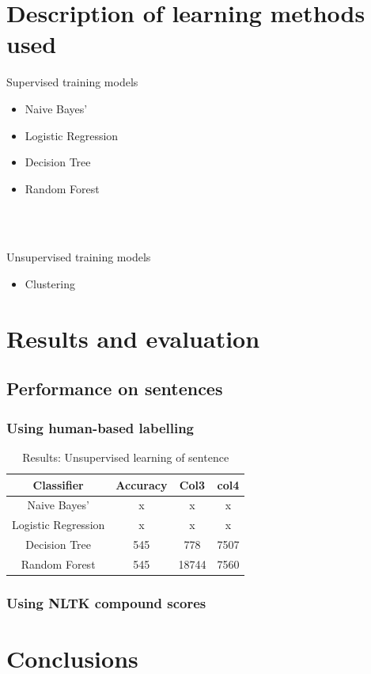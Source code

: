 \documentclass[10pt, a4paper]{article}
\begin{document}
\section{Description of learning methods used}

Supervised training models
\begin{itemize}
    \item Naive Bayes'
    \item Logistic Regression
    \item Decision Tree
    \item Random Forest
\end{itemize}\\\


Unsupervised training models
\begin{itemize}
    \item Clustering
\end{itemize}

\section{Results and evaluation}

\subsection{Performance on sentences}

\subsubsection{Using human-based labelling}

\begin{table}[h]
\begin{center}
\begin{tabular}{||c c c c||} 
 \hline
 Classifier & Accuracy & Col3 & col4 \\ [0.5ex] 
 \hline\hline
 Naive Bayes' & x & x & x \\ 
 \hline 
 Logistic Regression & x & x & x \\
 \hline
 Decision Tree & 545 & 778 & 7507 \\
 \hline
 Random Forest & 545 & 18744 & 7560 \\
 \hline\hline
\end{tabular}
\caption{Results: Unsupervised learning of sentence}
\label{table:1}
\end{center}
\end{table}

\subsubsection{Using NLTK compound scores}


\section{Conclusions}





\end{document}
